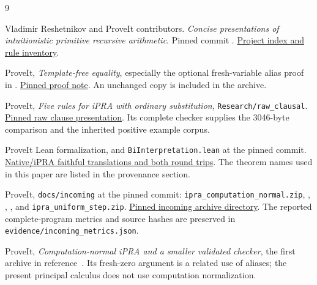 \documentclass[11pt,letterpaper]{article}
\begin{document}
\begin{thebibliography}{9}
\raggedright
{}
Vladimir Reshetnikov and ProveIt contributors.
\emph{Concise presentations of intuitionistic primitive recursive arithmetic}.
Pinned commit .
\href{https://github.com/VladimirReshetnikov/ProveIt/blob/5d85023b0688e03b75f0ec3a04bb43ef0bb51705/Logic/PrimitiveRecursiveArithmetic/ConciseIPRA/README.md}{Project index and rule inventory}.

ProveIt, \emph{Template-free equality}, especially the optional
fresh-variable alias proof in
.
\href{https://github.com/VladimirReshetnikov/ProveIt/blob/5d85023b0688e03b75f0ec3a04bb43ef0bb51705/Logic/PrimitiveRecursiveArithmetic/ConciseIPRA/Research/template_free/evidence/global_rewrite_marker_proof.md}{Pinned proof note}.
An unchanged copy is included in the archive.

ProveIt, \emph{Five rules for iPRA with ordinary substitution},
\texttt{Research/raw\_clausal}.
\href{https://github.com/VladimirReshetnikov/ProveIt/tree/5d85023b0688e03b75f0ec3a04bb43ef0bb51705/Logic/PrimitiveRecursiveArithmetic/ConciseIPRA/Research/raw_clausal}{Pinned raw clause presentation}.
Its complete checker supplies the 3046-byte comparison and the inherited
positive example corpus.

ProveIt Lean formalization,
 and
\texttt{BiInterpretation.lean} at the pinned commit.
\href{https://github.com/VladimirReshetnikov/ProveIt/blob/5d85023b0688e03b75f0ec3a04bb43ef0bb51705/Logic/PrimitiveRecursiveArithmetic/ConciseIPRA/Lean/ConciseIPRA/NativeBiInterpretation.lean}{Native/iPRA faithful translations and both round trips}.
The theorem names used in this paper are listed in the provenance section.

ProveIt, \texttt{docs/incoming} at the pinned commit:
\texttt{ipra\_computation\_normal.zip},
,
,
, and
\texttt{ipra\_uniform\_step.zip}.
\href{https://github.com/VladimirReshetnikov/ProveIt/tree/5d85023b0688e03b75f0ec3a04bb43ef0bb51705/Logic/PrimitiveRecursiveArithmetic/ConciseIPRA/docs/incoming}{Pinned incoming archive directory}.
The reported complete-program metrics and source hashes are preserved in
\texttt{evidence/incoming\_metrics.json}.

ProveIt, \emph{Computation-normal iPRA and a smaller validated checker},
the first archive in reference~\cite{incoming}.
Its fresh-zero argument is a related use of aliases; the present principal
calculus does not use computation normalization.
\end{thebibliography}
\end{document}
